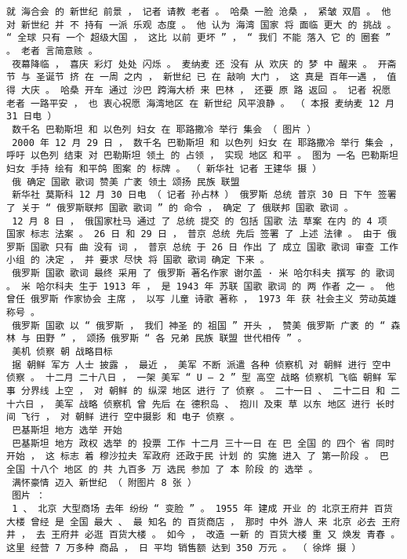 \documentclass{article}
\begin{document}
\begin{Verbatim}[commandchars=\\\{\}]
 就 海合会 的 新世纪 前景 ， 记者 请教 老者 。 哈桑 一脸 沧桑 ， 紧皱 双眉 。 他 对 新世纪 并 不 持有 一派 乐观 态度 。 他 认为 海湾 国家 将 面临 更大 的 挑战 。 “ 全球 只有 一个 超级大国 ， 这比 以前 更坏 ” ， “ 我们 不能 落入 它 的 圈套 ” 。 老者 言简意赅 。 
 夜幕降临 ， 喜庆 彩灯 处处 闪烁 。 麦纳麦 还 没有 从 欢庆 的 梦 中 醒来 。 开斋节 与 圣诞节 挤 在 一周 之内 ， 新世纪 已 在 敲响 大门 ， 这 真是 百年一遇 ， 值得 大庆 。 哈桑 开车 通过 沙巴 跨海大桥 来 巴林 ， 还要 原 路 返回 。 记者 祝愿 老者 一路平安 ， 也 衷心祝愿 海湾地区 在 新世纪 风平浪静 。 （ 本报 麦纳麦 12 月 31 日电 ） 
 数千名 巴勒斯坦 和 以色列 妇女 在 耶路撒冷 举行 集会 （ 图片 ） 
 2000 年 12 月 29 日 ， 数千名 巴勒斯坦 和 以色列 妇女 在 耶路撒冷 举行 集会 ， 呼吁 以色列 结束 对 巴勒斯坦 领土 的 占领 ， 实现 地区 和平 。 图为 一名 巴勒斯坦 妇女 手持 绘有 和平鸽 图案 的 标牌 。 （ 新华社 记者 王建华 摄 ） 
 俄 确定 国歌 歌词 赞美 广袤 领土 颂扬 民族 联盟 
 新华社 莫斯科 12 月 30 日电 （ 记者 孙占林 ） 俄罗斯 总统 普京 30 日 下午 签署 了 关于 “ 俄罗斯联邦 国歌 歌词 ” 的 命令 ， 确定 了 俄联邦 国歌 歌词 。 
 12 月 8 日 ， 俄国家杜马 通过 了 总统 提交 的 包括 国歌 法 草案 在内 的 4 项 国家 标志 法案 。 26 日 和 29 日 ， 普京 总统 先后 签署 了 上述 法律 。 由于 俄罗斯 国歌 只有 曲 没有 词 ， 普京 总统 于 26 日 作出 了 成立 国歌 歌词 审查 工作 小组 的 决定 ， 并 要求 尽快 将 国歌 歌词 确定 下来 。 
 俄罗斯 国歌 歌词 最终 采用 了 俄罗斯 著名作家 谢尔盖 · 米 哈尔科夫 撰写 的 歌词 。 米 哈尔科夫 生于 1913 年 ， 是 1943 年 苏联 国歌 歌词 的 两 作者 之一 。 他 曾任 俄罗斯 作家协会 主席 ， 以写 儿童 诗歌 著称 ， 1973 年 获 社会主义 劳动英雄 称号 。 
 俄罗斯 国歌 以 “ 俄罗斯 ， 我们 神圣 的 祖国 ” 开头 ， 赞美 俄罗斯 广袤 的 “ 森林 与 田野 ” ， 颂扬 俄罗斯 “ 各 兄弟 民族 联盟 世代相传 ” 。 
 美机 侦察 朝 战略目标 
 据 朝鲜 军方 人士 披露 ， 最近 ， 美军 不断 派遣 各种 侦察机 对 朝鲜 进行 空中 侦察 。 十二月 二十八日 ， 一架 美军 “ U — 2 ” 型 高空 战略 侦察机 飞临 朝鲜 军事 分界线 上空 ， 对 朝鲜 的 纵深 地区 进行 了 侦察 。 二十一日 、 二十二日 和 二十六日 ， 美军 战略 侦察机 曾 先后 在 德积岛 、 抱川 及束 草 以东 地区 进行 长时间 飞行 ， 对 朝鲜 进行 空中摄影 和 电子 侦察 。 
 巴基斯坦 地方 选举 开始 
 巴基斯坦 地方 政权 选举 的 投票 工作 十二月 三十一日 在 巴 全国 的 四个 省 同时 开始 ， 这 标志 着 穆沙拉夫 军政府 还政于民 计划 的 实施 进入 了 第一阶段 。 巴 全国 十八个 地区 的 共 九百多 万 选民 参加 了 本 阶段 的 选举 。 
 满怀豪情 迈入 新世纪 （ 附图片 8 张 ） 
 图片 ： 
 1 、 北京 大型商场 去年 纷纷 “ 变脸 ” 。 1955 年 建成 开业 的 北京王府井 百货大楼 曾经 是 全国 最大 、 最 知名 的 百货商店 ， 那时 中外 游人 来 北京 必去 王府井 ， 去 王府井 必逛 百货大楼 。 如今 ， 改造 一新 的 百货大楼 重 又 焕发 青春 。 这里 经营 7 万多种 商品 ， 日 平均 销售额 达到 350 万元 。 （ 徐烨 摄 ） 

\end{Verbatim}
\end{document}
